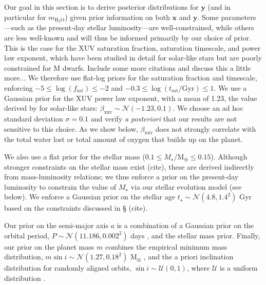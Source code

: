\documentclass[]{emulateapj}
\newcommand{\note}[1]{{\color{red} #1}}
\newcommand{\cn}{\note{(cite)}}
\begin{document}
Our goal in this section is to derive posterior distributions for $\mathbf{y}$ (and in particular for $m_\mathrm{H_2O}$) 
given prior information on both 
$\mathbf{x}$ and $\mathbf{y}$. Some parameters---such as the present-day stellar luminosity---are well-constrained,
while others are less well-known and will thus be informed primarily by our choice of prior. This is the case for
the XUV saturation fraction, saturation timescale, and power law exponent, which have been studied in detail 
for solar-like stars \citep{Ribas05} but are poorly constrained for M dwarfs. \note{Include some more citations
and discuss this a little more...}
We therefore use flat-log priors for the saturation fraction and timescale, enforcing
$-5 \leq \log(f_\mathrm{sat}) \leq -2$ and $-0.3 \leq \log(t_\mathrm{sat} / \mathrm{Gyr}) \leq 1$. We use
a Gaussian prior for the XUV power law exponent, with a mean of 1.23, the value derived by \citep{Ribas05} for
solar-like stars: $\beta_\mathrm{xuv} \sim \mathcal{N}(-1.23, 0.1)$. We choose an ad hoc standard deviation
$\sigma = 0.1$ and verify \emph{a posteriori} that our results are not sensitive to this choice. As we show
below, $\beta_\mathrm{xuv}$ does not strongly correlate with the total water lost or total
amount of oxygen that builds up on the planet.

We also use a flat prior for the stellar mass ($0.1 \leq M_\star / \mathrm{M}_\oplus \leq 0.15$).
Although stronger constraints on the stellar mass exist \cn, these are derived indirectly from mass-luminosity relations; we thus
enforce a prior on the present-day luminosity to constrain the value of $M_\star$ via our stellar evolution model (see below).
We enforce a Gaussian prior on the stellar age $t_\star \sim \mathcal{N}(4.8, 1.4^2)$ Gyr based on the constraints discussed
in \S\cn. 

Our prior on the semi-major axis $a$ is a combination of a Gaussian prior on the orbital period, 
$P \sim \mathcal{N}(11.186, 0.002^2)$ days \citep{AngladaEscude16}, and the stellar mass prior. 
Finally, our prior on the planet mass $m$ combines the empirical minimum mass distribution,
$m\sin i \sim \mathcal{N}(1.27, 0.18^2)$ M$_\oplus$ \citep{AngladaEscude16}, and the a priori inclination distribution
for randomly aligned orbits, 
$\sin i \sim \mathcal{U}(0, 1)$, where $\mathcal{U}$ is a uniform distribution \citep[e.g.,][]{Luger17}.
\end{document}
